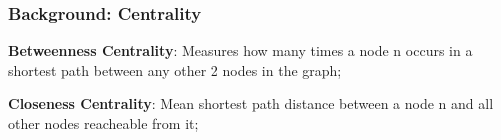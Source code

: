 \documentclass[10pt]{beamer}
\begin{document}
\begin{frame}
\frametitle{Background: Centrality}

\textbf{Betweenness Centrality}: Measures how many times a node n occurs in a shortest path between any other 2 nodes in the graph;

\textbf{Closeness Centrality}: Mean shortest path distance between a node n and all other nodes reacheable from it;

\end{frame}








\end{document}
